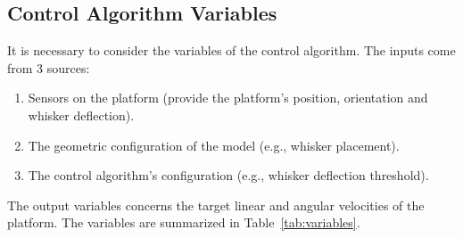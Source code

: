 \subsection{Control Algorithm Variables}

It is necessary to consider the variables of the control algorithm.
The inputs come from 3 sources:
\begin{enumerate}
    \item Sensors on the platform (provide the platform's position, orientation and whisker deflection).
    \item The geometric configuration of the model (e.g., whisker placement).
    \item The control algorithm's configuration (e.g., whisker deflection threshold).
\end{enumerate}
The output variables concerns the target linear and angular velocities of the platform.
The variables are summarized in Table~\ref{tab:variables}.

